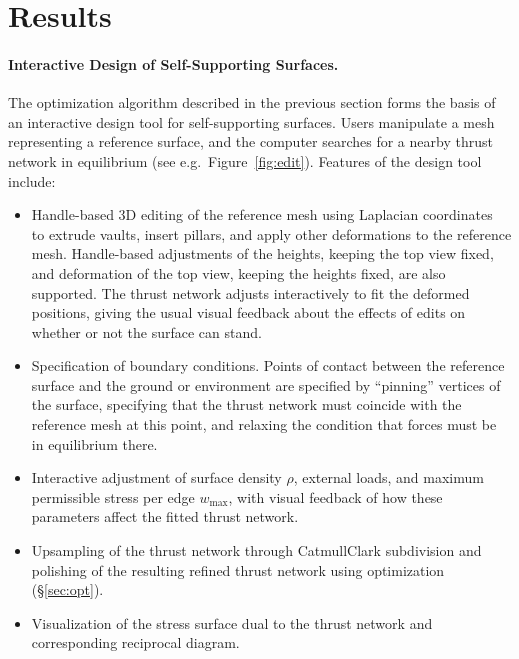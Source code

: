 \documentclass[review]{acmsiggraph}
\newcommand{\secref}[1]{(\S\ref{#1})}
\begin{document}
\section{Results}
\label{sec:design}

\paragraph{Interactive Design of Self-Supporting Surfaces.}

The optimization algorithm described in the previous section forms the
basis of an interactive design tool for self-supporting surfaces. Users
manipulate a mesh representing a reference surface, and the computer
searches for a nearby thrust network in equilibrium (see e.g.\
Figure~\ref{fig:edit}). Features of the design tool include:

\begin{itemize}\itemsep-\parsep

\item Handle-based 3D editing of the reference mesh using Laplacian
coordinates~\cite{Lipman2004,Sorkine2003} to extrude vaults, insert
pillars, and apply other deformations to the reference mesh. Handle-based
adjustments of the heights, keeping the top view fixed, and deformation of
the top view, keeping the heights fixed, are also supported. The thrust
network adjusts interactively to fit the deformed positions, giving the
usual visual feedback about the effects of edits on whether or not the
surface can stand.

\item Specification of boundary conditions. Points of contact between the
reference surface and the ground or environment are specified by
``pinning'' vertices of the surface, specifying that the thrust network
must coincide with the reference mesh at this point, and relaxing the
condition that forces must be in equilibrium there.

\item Interactive adjustment of surface density $\rho$, external loads,
and maximum permissible stress per edge $w_{\textrm{max}}$, with visual
feedback of how these parameters affect the fitted thrust network.

\item Upsampling of the thrust network through Catmull\dash Clark
subdivision \nix{\cite{catmull78}}
and polishing of the resulting refined thrust
network using optimization \secref{sec:opt}.

\item Visualization of the stress surface dual to the thrust network
and corresponding reciprocal diagram.

\end{itemize}
\end{document}

